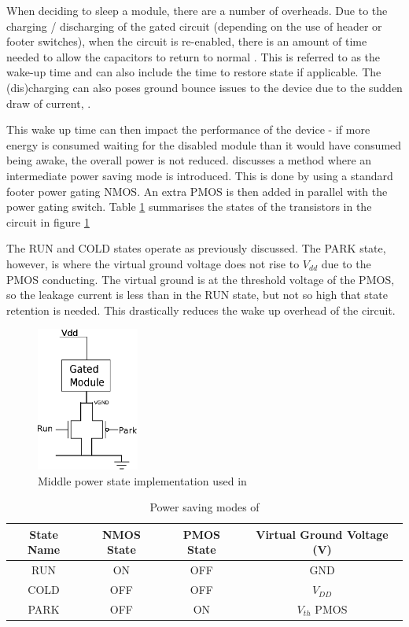 When deciding to sleep a module, there are a number of overheads.
Due to the charging / discharging of the gated circuit (depending on the use of header or footer switches), when the circuit is re-enabled, there is an amount of time needed to allow the capacitors to return to normal \cite{abdollahi2005effective}.
This is referred to as the wake-up time and can also include the time to restore state if applicable.
The (dis)charging can also poses ground bounce issues to the device due to the sudden draw of current, \cite{kim2003understanding,chang1997analysis}. 

This wake up time can then impact the performance of the device - if more energy is consumed waiting for the disabled module than it would have consumed being awake, the overall power is not reduced.
\cite{kim2004experimental} discusses a method where an intermediate power saving mode is introduced.
This is done by using a standard footer power gating NMOS. 
An extra PMOS is then added in parallel with the power gating switch. 
Table \ref{tab:kim} summarises the states of the transistors in the circuit in figure \ref{fig:kim}

The RUN and COLD states operate as previously discussed. 
The PARK state, however, is where the virtual ground voltage does not rise to $V_{dd}$ due to the PMOS conducting. 
The virtual ground is at the threshold voltage of the PMOS, so the leakage current is less than in the RUN state, but not so high that state retention is needed. 
This drastically reduces the wake up overhead of the circuit. 

\begin{figure}
\centering
\includegraphics[width=0.3\textwidth]{Figures/powergating_kim.eps}
\caption{Middle power state implementation used in \cite{kim2004experimental}}
\label{fig:kim}
\end{figure}

\begin{table}
\caption{Power saving modes of \cite{kim2004experimental}}
\label{tab:kim}
\centering
\begin{tabular}{|c|c|c|c|}\hline
State Name & NMOS State & PMOS State & Virtual Ground Voltage (V)\\ \hline
RUN  & ON   & OFF  & GND \\
COLD & OFF  & OFF  & $V_{DD}$ \\
PARK & OFF  & ON   & $V_{th}$ PMOS \\ \hline
\end{tabular}
\end{table}

